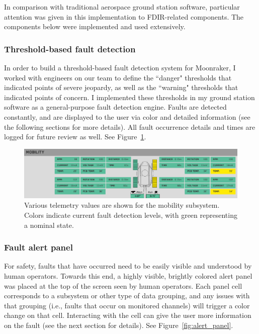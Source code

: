 In comparison with traditional aerospace ground station software, particular attention was given in this implementation to FDIR-related components. The components below were implemented and used extensively.

\subsubsection{Threshold-based fault detection}

In order to build a threshold-based fault detection system for Moonraker, I worked with engineers on our team to define the ``danger" thresholds that indicated points of severe jeopardy, as well as the ``warning" thresholds that indicated points of concern. I implemented these thresholds in my ground station software as a general-purpose fault detection engine. Faults are detected constantly, and are displayed to the user via color and detailed information (see the following sections for more details). All fault occurrence details and times are logged for future review as well. See Figure~\ref{fig:mobility_telem_subpanel}.

\begin{figure}[h]
\centering
    \includegraphics[width=\columnwidth]{images/mobility_telem_subpanel.png}
    \caption{Various telemetry values are shown for the mobility subsystem. Colors indicate current fault detection levels, with green representing a nominal state.}
    \label{fig:mobility_telem_subpanel}
\end{figure}

\subsubsection{Fault alert panel}

For safety, faults that have occurred need to be easily visible and understood by human operators. Towards this end, a highly visible, brightly colored alert panel was placed at the top of the screen seen by human operators. Each panel cell corresponds to a subsystem or other type of data grouping, and any issues with that grouping (i.e., faults that occur on monitored channels) will trigger a color change on that cell. Interacting with the cell can give the user more information on the fault (see the next section for details). See Figure~\ref{fig:alert_panel}.

